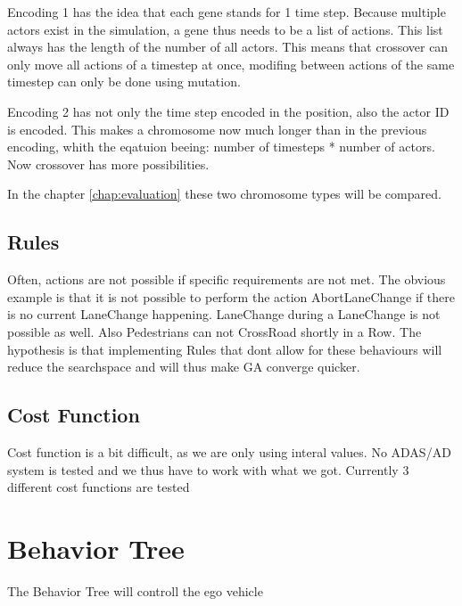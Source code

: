 Encoding 1 has the idea that each gene stands for 1 time step. Because multiple actors exist in the simulation, a gene thus needs to be a list of actions. This list always has the length of the number of all actors. This means that crossover can only move all actions of a timestep at once, modifing between actions of the same timestep can only be done using mutation.

Encoding 2 has not only the time step encoded in the position, also the actor ID is encoded. This makes a chromosome now much longer than in the previous encoding, whith the eqatuion beeing: number of timesteps * number of actors. Now crossover has more possibilities.

In the chapter \ref{chap:evaluation} these two chromosome types will be compared.

\subsection{Rules}
Often, actions are not possible if specific requirements are not met. The obvious example is that it is not possible to perform the action AbortLaneChange if there is no current LaneChange happening. LaneChange during a LaneChange is not possible as well. Also Pedestrians can not CrossRoad shortly in a Row.
The hypothesis is that implementing Rules that dont allow for these behaviours will reduce the searchspace and will thus make GA converge quicker.

\subsection{Cost Function}
Cost function is a bit difficult, as we are only using interal values. No ADAS/AD system is tested and we thus have to work with what we got.
Currently 3 different cost functions are tested


\section{Behavior Tree}
The Behavior Tree will controll the ego vehicle 



